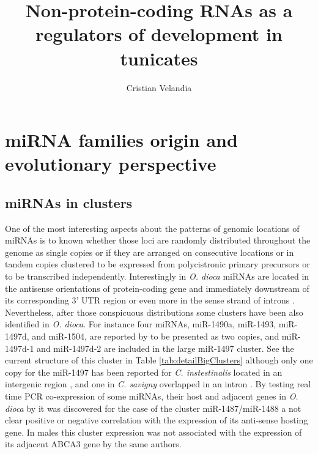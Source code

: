 \documentclass[11pt]{article}
\title{Non-protein-coding RNAs as a regulators of development in tunicates}
\author{Cristian Velandia}
\begin{document}
\maketitle


\section*{miRNA families origin and evolutionary perspective}
\subsection*{miRNAs in clusters}

One of the most interesting aspects about the patterns of genomic locations of miRNAs is to known whether those loci are randomly distributed throughout the genome as single copies or if they are arranged on consecutive locations or in tandem copies clustered to be expressed from polycistronic primary precursors or to be transcribed independently. Interestingly in \textit{O. dioca} miRNAs are located in the antisense orientations of protein-coding gene and immediately downstream of its corresponding 3’ UTR region or even more in the sense strand of introns \cite{Fu2008}. Nevertheless, after those conspicuous distributions some clusters have been also identified in \textit{O. dioca}. For instance four miRNAs, miR-1490a, miR-1493, miR-1497d, and miR-1504, are reported by \cite{Fu2008} to be presented as two copies, and miR-1497d-1 and miR-1497d-2 are included in the large miR-1497 cluster. See the current structure of this cluster in Table \ref{tab:detailBigClusters} although only one copy for the  miR-1497 has been reported for \textit{C. instestinalis} located in an intergenic region \cite{Fu2008}, \cite{Hendrix2010} and one in \textit{C. savigny} overlapped in an intron \cite{Fu2008}. By testing real time PCR co-expression of some miRNAs, their host and adjacent genes in \textit{O. dioca} by \cite{Fu2008} it was discovered for the case of the cluster  miR-1487/miR-1488 a not clear positive or negative correlation with the expression of its anti-sense hosting gene. In males this cluster expression was not associated with the expression of its adjacent ABCA3 gene by the same authors.  
\end{document}
